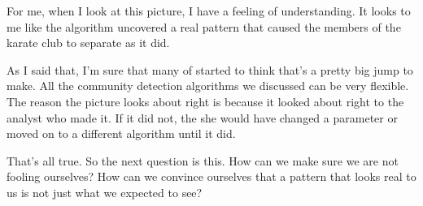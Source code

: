 { %
  \begin{frame}[plain]
  \end{frame}
}
  
\mode*

For me, when I look at this picture, I have a feeling of
understanding. It looks to me like the algorithm uncovered a real
pattern that caused the members of the karate club to separate as it
did. 

As I said that, I'm sure that many of started to think that's a pretty
big jump to make. All the community detection algorithms we discussed
can be very flexible. The reason the picture looks about right is
because it looked about right to the analyst who made it. If it did
not, the she would have changed a parameter or moved on to a different
algorithm until it did.

That's all true. So the next question is this. How can we make sure we
are not fooling ourselves? How can we convince ourselves that a
pattern that looks real to us is not just what we expected to see?


